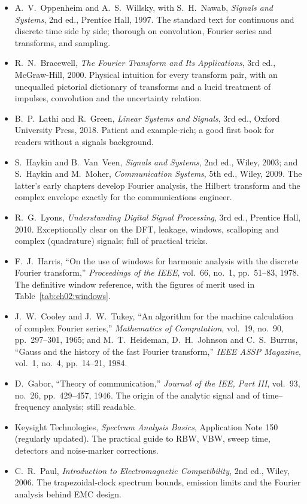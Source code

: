 \furtherreading
\begin{itemize}
\item A.~V.~Oppenheim and A.~S.~Willsky, with S.~H.~Nawab, \emph{Signals and Systems}, 2nd ed.,
Prentice Hall, 1997. The standard text for continuous and discrete time side by side; thorough on
convolution, Fourier series and transforms, and sampling.
\item R.~N.~Bracewell, \emph{The Fourier Transform and Its Applications}, 3rd ed., McGraw-Hill, 2000.
Physical intuition for every transform pair, with an unequalled pictorial dictionary of transforms and
a lucid treatment of impulses, convolution and the uncertainty relation.
\item B.~P.~Lathi and R.~Green, \emph{Linear Systems and Signals}, 3rd ed., Oxford University Press,
2018. Patient and example-rich; a good first book for readers without a signals background.
\item S.~Haykin and B.~Van~Veen, \emph{Signals and Systems}, 2nd ed., Wiley, 2003; and S.~Haykin and
M.~Moher, \emph{Communication Systems}, 5th ed., Wiley, 2009. The latter's early chapters develop
Fourier analysis, the Hilbert transform and the complex envelope exactly for the communications
engineer.
\item R.~G.~Lyons, \emph{Understanding Digital Signal Processing}, 3rd ed., Prentice Hall, 2010.
Exceptionally clear on the DFT, leakage, windows, scalloping and complex (quadrature) signals; full of
practical tricks.
\item F.~J.~Harris, ``On the use of windows for harmonic analysis with the discrete Fourier
transform,'' \emph{Proceedings of the IEEE}, vol.~66, no.~1, pp.~51--83, 1978. The definitive window
reference, with the figures of merit used in Table~\ref{tab:ch02:windows}.
\item J.~W.~Cooley and J.~W.~Tukey, ``An algorithm for the machine calculation of complex Fourier
series,'' \emph{Mathematics of Computation}, vol.~19, no.~90, pp.~297--301, 1965; and M.~T.~Heideman,
D.~H.~Johnson and C.~S.~Burrus, ``Gauss and the history of the fast Fourier transform,'' \emph{IEEE ASSP
Magazine}, vol.~1, no.~4, pp.~14--21, 1984.
\item D.~Gabor, ``Theory of communication,'' \emph{Journal of the IEE, Part III}, vol.~93, no.~26,
pp.~429--457, 1946. The origin of the analytic signal and of time--frequency analysis; still readable.
\item Keysight Technologies, \emph{Spectrum Analysis Basics}, Application Note 150 (regularly updated).
The practical guide to RBW, VBW, sweep time, detectors and noise-marker corrections.
\item C.~R.~Paul, \emph{Introduction to Electromagnetic Compatibility}, 2nd ed., Wiley, 2006. The
trapezoidal-clock spectrum bounds, emission limits and the Fourier analysis behind EMC design.
\end{itemize}
